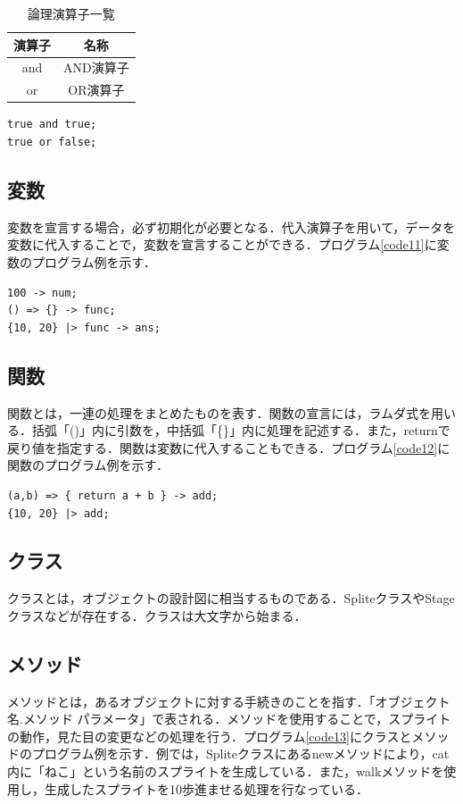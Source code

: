\documentclass[10pt,a4j]{ltjsarticle}
\begin{document}
\begin{table}[H]
 \caption{論理演算子一覧}
 \label{tab:table03}
 \centering
  \begin{tabular}{cc}
   \hline
   演算子 & 名称 \\
   \hline \hline
   and & AND演算子 \\
   or & OR演算子 \\
   \hline
  \end{tabular}
\end{table}

\begin{lstlisting}[caption=論理演算子のプログラム例, label=code10]
true and true;
true or false;
\end{lstlisting}

\subsection{変数}
変数を宣言する場合，必ず初期化が必要となる．代入演算子を用いて，データを変数に代入することで，変数を宣言することができる．プログラム\ref{code11}に変数のプログラム例を示す．

\begin{lstlisting}[caption=変数のプログラム例, label=code11]
100 -> num;
() => {} -> func;
{10, 20} |> func -> ans; 
\end{lstlisting}

\subsection{関数}
関数とは，一連の処理をまとめたものを表す．関数の宣言には，ラムダ式を用いる．括弧「()」内に引数を，中括弧「\{\}」内に処理を記述する．また，returnで戻り値を指定する．関数は変数に代入することもできる．プログラム\ref{code12}に関数のプログラム例を示す．

\begin{lstlisting}[caption=関数のプログラム例, label=code12]
(a,b) => { return a + b } -> add;
{10, 20} |> add;
\end{lstlisting}

\subsection{クラス}
クラスとは，オブジェクトの設計図に相当するものである．SpliteクラスやStageクラスなどが存在する．クラスは大文字から始まる．

\subsection{メソッド}
メソッドとは，あるオブジェクトに対する手続きのことを指す．「オブジェクト名.メソッド パラメータ」で表される．メソッドを使用することで，スプライトの動作，見た目の変更などの処理を行う．プログラム\ref{code13}にクラスとメソッドのプログラム例を示す．例では，Spliteクラスにあるnewメソッドにより，cat内に「ねこ」という名前のスプライトを生成している．また，walkメソッドを使用し，生成したスプライトを10歩進ませる処理を行なっている．
\end{document}
